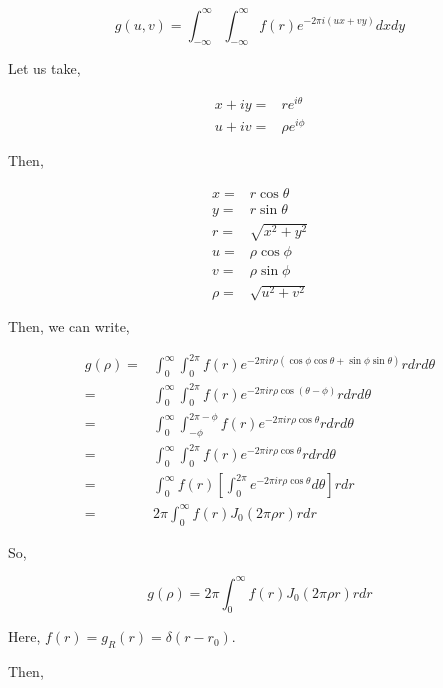 \documentclass[a4paper,11pt]{article}
\begin{document}
$$g(u,v)=\int_{-\infty}^{\infty}\int_{-\infty}^{\infty} f(r) e^{-2\pi i\left(ux+vy\right)} dxdy$$

Let us take,

\begin{equation*}
\begin{split}
x+iy = & re^{i\theta}\\
u+iv = & \rho e^{i\phi}
\end{split}
\end{equation*}

Then,

\begin{equation*}
\begin{split}
x = & r\cos\theta\\
y = & r\sin\theta\\
r = & \sqrt{x^2+y^2}\\
u = & \rho\cos\phi\\
v = & \rho\sin\phi \\
\rho = & \sqrt{u^2+v^2}
\end{split}
\end{equation*}

Then, we can write,

\begin{equation*}
\begin{split}
g(\rho) = & \int_0^\infty\int_0^{2\pi} f(r)e^{-2\pi ir\rho\left(\cos\phi\cos\theta+\sin\phi\sin\theta\right)}rdrd\theta \\
= & \int_0^\infty\int_0^{2\pi} f(r)e^{-2\pi ir\rho\cos\left(\theta-\phi\right)} rdrd\theta \\
= & \int_0^\infty\int_{-\phi}^{2\pi-\phi} f(r)e^{-2\pi ir\rho\cos\theta}rdrd\theta \\
= & \int_0^\infty\int_{0}^{2\pi} f(r)e^{-2\pi ir\rho\cos\theta}rdrd\theta \\
= & \int_0^\infty f(r) \left[\int_0^{2\pi}e^{-2\pi ir\rho\cos\theta}d\theta\right]rdr \\
= & 2\pi\int_0^\infty f(r)J_0\left(2\pi \rho r\right) rdr
\end{split}
\end{equation*}

So,

\begin{equation}
\label{eq:orgc6445f3}
g(\rho) = 2\pi\int_0^\infty f(r)J_0\left(2\pi \rho r\right) rdr
\end{equation}


Here, \(f(r)=g_R(r)=\delta(r-r_0)\).

Then, 
\end{document}
